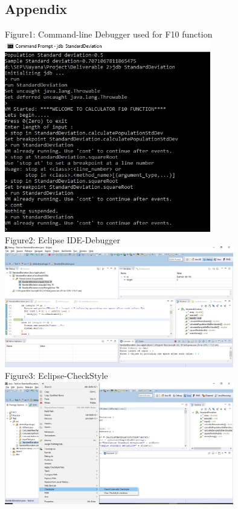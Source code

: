 \documentclass[a4paper,12pt]{article}
\begin{document}
\begin{titlepage}
\section{Appendix}
Figure1: Command-line Debugger used for F10 function \\
\includegraphics[width=9.0cm]{JDBDebugger.jpg}\\
\newline
Figure2: Eclipse IDE-Debugger\\
\includegraphics[width=10.0cm]{IDE-SC.jpg}\\
\newline
Figure3: Eclipse-CheckStyle\\
\includegraphics[width=10.0cm]{Checkstyle.jpg}\\

\end{titlepage}
\end{document}
